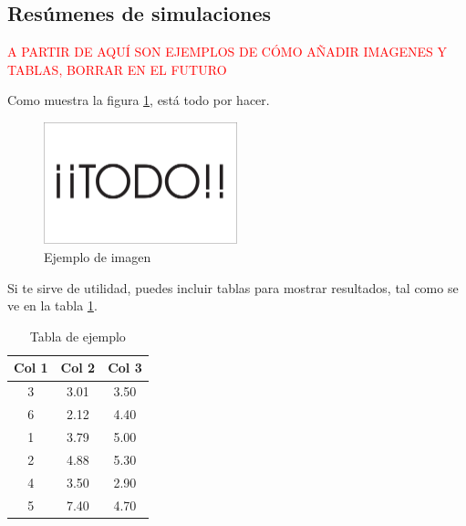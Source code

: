 \subsection{Resúmenes de simulaciones}




























\textcolor{red}{A PARTIR DE AQUÍ SON EJEMPLOS DE CÓMO AÑADIR IMAGENES Y TABLAS, BORRAR EN EL FUTURO}


Como muestra la figura \ref{fig:sampleImage}, está todo por hacer.

\begin{figure}[h]
	\centering
	\includegraphics[width = 0.5\textwidth]{Imagenes/Vectorial/Todo.pdf}
	\caption{Ejemplo de imagen}
	\label{fig:sampleImage}
\end{figure}

Si te sirve de utilidad,  puedes incluir tablas para mostrar resultados, tal como se ve en la tabla \ref{tab:sampleTable}.


\begin{table}
	\centering
	\begin{tabular}{c|c|c}
		\textbf{Col 1} & \textbf{Col 2} & \textbf{Col 3} \\
		\hline\hline
		3 & 3.01 & 3.50\\
		6 & 2.12 & 4.40\\
		1 & 3.79 & 5.00\\
		2 & 4.88 & 5.30\\
		4 & 3.50 & 2.90\\
		5 & 7.40 & 4.70\\
		\hline
	\end{tabular}
	\caption{Tabla de ejemplo}
	\label{tab:sampleTable}
\end{table}
